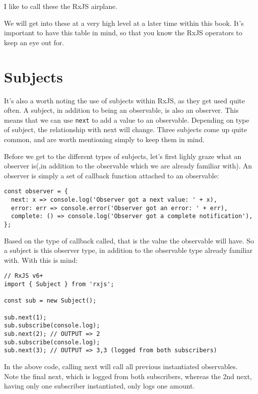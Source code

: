 I like to call these the RxJS airplane. 

We will get into these at a very high level at a later time within this book. 
It's important to have this table in mind, so that you know the RxJS operators 
to keep an eye out for. 

\section{Subjects}
It's also a worth noting the use of subjects within RxJS, as they get used
quite often. A subject, in addition to being an observable, is also an observer. 
This means that we can use \lstinline{next} to add a value to an observable. 
Depending on type of subject, the relationship with next will change. Three 
subjects come up quite common, and are worth mentioning simply to keep them in 
mind. 

Before we get to the different types of subjects, let's first lighly graze 
what an observer is(,in addition to the observable which we are already 
familiar with). An observer is simply a set of callback function attached 
to an observable: 
\begin{verbatim}
const observer = {
  next: x => console.log('Observer got a next value: ' + x),
  error: err => console.error('Observer got an error: ' + err),
  complete: () => console.log('Observer got a complete notification'),
};  
\end{verbatim}

Based on the type of callback called, that is the value the observable will 
have. So a subject is this observer type, in addition to the observable type 
already familiar with. With this is mind: 

\begin{lstlisting}[caption=using next on our subject]
// RxJS v6+
import { Subject } from 'rxjs';

const sub = new Subject();

sub.next(1);
sub.subscribe(console.log);
sub.next(2); // OUTPUT => 2
sub.subscribe(console.log);
sub.next(3); // OUTPUT => 3,3 (logged from both subscribers)
\end{lstlisting}

In the above code, calling next will call all previous instantiated observables. 
Note the final next, which is logged from both subscribers, whereas the 2nd next, 
having only one subscriber instantiated, only logs one amount.

